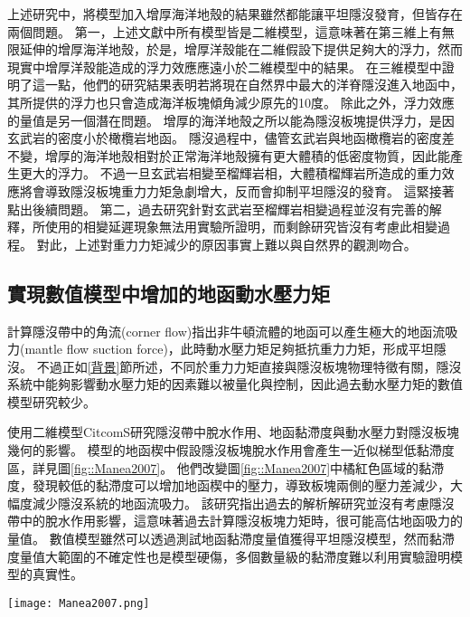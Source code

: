 上述研究中，將模型加入增厚海洋地殼的結果雖然都能讓平坦隱沒發育，但皆存在兩個問題。
第一，上述文獻中所有模型皆是二維模型，這意味著在第三維上有無限延伸的增厚海洋地殼，於是，增厚洋殼能在二維假設下提供足夠大的浮力，然而現實中增厚洋殼能造成的浮力效應應遠小於二維模型中的結果。
\citealp{florez2019impact}在三維模型中證明了這一點，他們的研究結果表明若將現在自然界中最大的洋脊隱沒進入地函中，其所提供的浮力也只會造成海洋板塊傾角減少原先的10度。
除此之外，浮力效應的量值是另一個潛在問題。
增厚的海洋地殼之所以能為隱沒板塊提供浮力，是因玄武岩的密度小於橄欖岩地函。
隱沒過程中，儘管玄武岩與地函橄欖岩的密度差不變，增厚的海洋地殼相對於正常海洋地殼擁有更大體積的低密度物質，因此能產生更大的浮力。
不過一旦玄武岩相變至榴輝岩相，大體積榴輝岩所造成的重力效應將會導致隱沒板塊重力力矩急劇增大，反而會抑制平坦隱沒的發育。
這緊接著點出後續問題。
第二，過去研究針對玄武岩至榴輝岩相變過程並沒有完善的解釋，\citealp{van2002role}所使用的相變延遲現象無法用實驗所證明，而剩餘研究皆沒有考慮此相變過程。
對此，上述對重力力矩減少的原因事實上難以與自然界的觀測吻合。


\subsection{實現數值模型中增加的地函動水壓力矩}
\citealp{tovish1978mantle}計算隱沒帶中的角流(corner flow)指出非牛頓流體的地函可以產生極大的地函流吸力(mantle flow suction force)，此時動水壓力矩足夠抵抗重力力矩，形成平坦隱沒。
不過正如\ref{背景}節所述，不同於重力力矩直接與隱沒板塊物理特徵有關，隱沒系統中能夠影響動水壓力矩的因素難以被量化與控制，因此過去動水壓力矩的數值模型研究較少。

\citealp{Manea2007}使用二維模型CitcomS研究隱沒帶中脫水作用、地函黏滯度與動水壓力對隱沒板塊幾何的影響。
模型的地函楔中假設隱沒板塊脫水作用會產生一近似梯型低黏滯度區，詳見圖\ref{fig::Manea2007}。
他們改變圖\ref{fig::Manea2007}中橘紅色區域的黏滯度，發現較低的黏滯度可以增加地函楔中的壓力，導致板塊兩側的壓力差減少，大幅度減少隱沒系統的地函流吸力。
該研究指出過去\citealp{tovish1978mantle}的解析解研究並沒有考慮隱沒帶中的脫水作用影響，這意味著過去計算隱沒板塊力矩時，很可能高估地函吸力的量值。
數值模型雖然可以透過測試地函黏滯度量值獲得平坦隱沒模型，然而黏滯度量值大範圍的不確定性也是模型硬傷，多個數量級的黏滯度難以利用實驗證明模型的真實性。

\begin{figure*}[ht!]
    \centering
    \texttt{[image: Manea2007.png]}
    \caption[\citealp{Manea2007}模型中所設定的低黏滯度近似梯形區與低黏滯度通道區域]{\citealp{Manea2007}模型中所設定的低黏滯度近似梯形區與低黏滯度通道區域，表示隱沒帶的脫水作用對地函楔造成的影響。}
    \label{fig::Manea2007}
\end{figure*}

